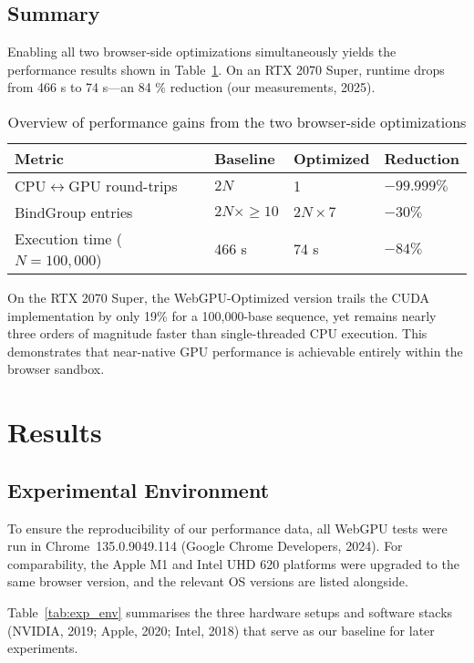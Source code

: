 \documentclass[PhD]{PHlab-thesis}
\begin{document}
\section{Summary}
Enabling all two browser-side optimizations simultaneously yields the performance results shown in Table~\ref{tab:opt_performance}. On an RTX 2070 Super, runtime drops from 466 s to 74 s—an 84 \% reduction (our measurements, 2025).
\begin{table}[h]
    \centering
    \setlength{\tabcolsep}{6pt}
    \renewcommand{\arraystretch}{1.4}
    \small
    \begin{tabularx}{\textwidth}{|X|X|X|X|}
        \hline
        Metric & Baseline & Optimized & Reduction \\
        \hline
        CPU$\leftrightarrow$GPU round-trips & $2N$ & 1 & $-99.999\%$ \\
        BindGroup entries & $2N \times \geq 10$ & $2N \times 7$ & $-30\%$ \\
        Execution time ($N = 100{,}000$) & 466 s & 74 s & $-84\%$ \\
        \hline
    \end{tabularx}
    \caption{Overview of performance gains from the two browser-side optimizations}
    \label{tab:opt_performance}
\end{table}
On the RTX 2070 Super, the WebGPU-Optimized version trails the CUDA implementation by only 19\% for a 100,000-base sequence, yet remains nearly three orders of magnitude faster than single-threaded CPU execution. This demonstrates that near-native GPU performance is achievable entirely within the browser sandbox.



	
\chapter{Results}
\section{Experimental Environment}
To ensure the reproducibility of our performance data, all WebGPU tests were run in Chrome~135.0.9049.114 (Google Chrome Developers, 2024). For comparability, the Apple M1 and Intel UHD 620 platforms were upgraded to the same browser version, and the relevant OS versions are listed alongside.


Table~\ref{tab:exp_env} summarises the three hardware setups and software stacks (NVIDIA, 2019; Apple, 2020; Intel, 2018) that serve as our baseline for later experiments.
\end{document}
